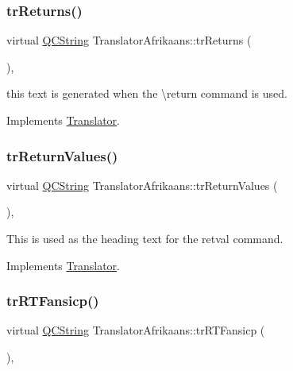 \subsubsection{\texorpdfstring{trReturns()}{trReturns()}}
{\footnotesize\ttfamily virtual \mbox{\hyperlink{class_q_c_string}{Q\+C\+String}} Translator\+Afrikaans\+::tr\+Returns (\begin{DoxyParamCaption}{ }\end{DoxyParamCaption})\hspace{0.3cm}{\ttfamily [inline]}, {\ttfamily [virtual]}}

this text is generated when the \textbackslash{}return command is used. 

Implements \mbox{\hyperlink{class_translator}{Translator}}.

\mbox{\label{class_translator_afrikaans_aca87dbaef3f60b3532ca9e4546eaa069}} 
\subsubsection{\texorpdfstring{trReturnValues()}{trReturnValues()}}
{\footnotesize\ttfamily virtual \mbox{\hyperlink{class_q_c_string}{Q\+C\+String}} Translator\+Afrikaans\+::tr\+Return\+Values (\begin{DoxyParamCaption}{ }\end{DoxyParamCaption})\hspace{0.3cm}{\ttfamily [inline]}, {\ttfamily [virtual]}}

This is used as the heading text for the retval command. 

Implements \mbox{\hyperlink{class_translator}{Translator}}.

\mbox{\label{class_translator_afrikaans_a13bcc041069710cb537ffdedb1b7359d}} 
\subsubsection{\texorpdfstring{trRTFansicp()}{trRTFansicp()}}
{\footnotesize\ttfamily virtual \mbox{\hyperlink{class_q_c_string}{Q\+C\+String}} Translator\+Afrikaans\+::tr\+R\+T\+Fansicp (\begin{DoxyParamCaption}{ }\end{DoxyParamCaption})\hspace{0.3cm}{\ttfamily [inline]}, {\ttfamily [virtual]}}

